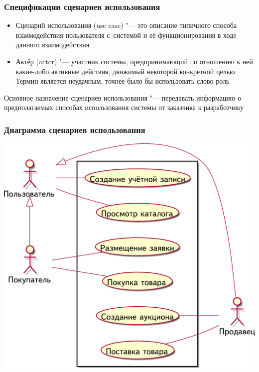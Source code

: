 \documentclass{softengineering-lectures}
\begin{document}
\begin{frame}
  \frametitle{Спецификации сценариев использования}

  \begin{itemize}
  \item \alert{Сценарий использования (use case)} "--- это описание типичного
    способа взаимодействия пользователя с~системой и её функционирования в ходе
    данного взаимодействия
  \item \alert{Актёр (actor)} "--- участник системы, предпринимающий по
    отношению к ней какие-либо активные действия, движимый некоторой конкретной
    целью. Термин является неудачным, точнее было бы использовать слово
    \alert{роль}
  \end{itemize}

  Основное назначение сценариев использования "--- передавать информацию о
  предполагаемых способах использования системы от заказчика к разработчику
\end{frame}

\begin{frame}
  \frametitle{Диаграмма сценариев использования}

  \centerline{\includegraphics[height=0.9\textheight]{usecase.pdf}}
\end{frame}
\end{document}
